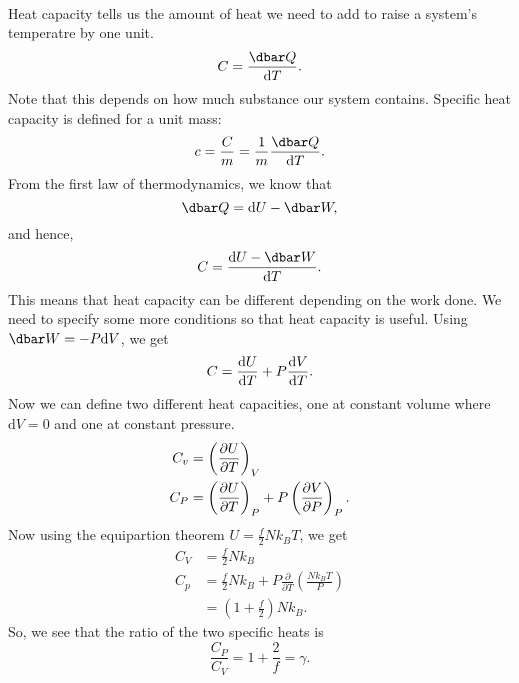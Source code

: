 \documentclass[../thermodynamics.tex]{subfiles}
\begin{document}
        \paragraph{}
        Heat capacity tells us the amount of heat we need to add to raise a system's temperatre by one unit.
        \begin{equation}
            C=\frac{\dbar Q}{\mathrm{d}T}.
        \end{equation}
        Note that this depends on how much substance our system contains.
        Specific heat capacity is defined for a unit mass:
        \begin{equation}
            c=\frac{C}{m}=\frac{1}{m}\frac{\dbar Q}{\mathrm{d}T}.
        \end{equation}
        From the first law of thermodynamics, we know that
        \begin{equation}
            \dbar Q=\mathrm{d}U-\dbar W,
        \end{equation}
        and hence,
        \begin{equation}
            C=\frac{\mathrm{d}U-\dbar W}{\mathrm{d}T}.
        \end{equation}
        This means that heat capacity can be different depending on the work done.
        We need to specify some more conditions so that heat capacity is useful.
        Using $\dbar W=-P\mathrm{d}V$, we get
        \begin{equation}
            C=\frac{\mathrm{d}U}{\mathrm{d}T}+P\frac{\mathrm{d}V}{\mathrm{d}T}.
        \end{equation}
        Now we can define two different heat capacities, one at constant volume where $\mathrm{d}V=0$ and one at constant pressure.
        \begin{align}
            C_v&=\left(\frac{\partial U}{\partial T}\right)_V\\
            C_P&=\left(\frac{\partial U}{\partial T}\right)_P+P\left(\frac{\partial V}{\partial P}\right)_P.
        \end{align}
        Now using the equipartion theorem $U=\frac{f}{2}Nk_BT$, we get
        \begin{align}
            C_V&=\frac{f}{2}Nk_B\\
            C_p&=\frac{f}{2}Nk_B+P\frac{\partial}{\partial T}\left(\frac{Nk_BT}{P}\right)\\
            &=\left(1+\frac{f}{2}\right)Nk_B.
        \end{align}
        So, we see that the ratio of the two specific heats is
        \begin{equation}
            \frac{C_P}{C_V}=1+\frac{2}{f}=\gamma.
        \end{equation}
\end{document}
